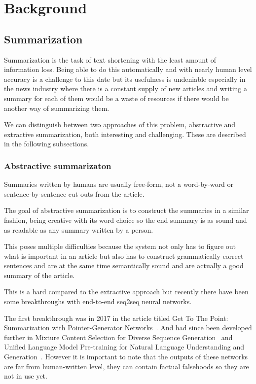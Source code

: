 \chapter{Background}\label{sect:Background}
\section{Summarization}
Summarization is the task of text shortening with the least amount of information loss. Being able to do this automatically and with nearly human level accuracy is a challenge to this date but its usefulness is undeniable especially in the news industry where there is a constant supply of new articles and writing a summary for each of them would be a waste of resources if there would be another way of summarizing them.

We can distinguish between two approaches of this problem, abstractive and extractive summarization, both interesting and challenging. These are described in the following subsections.

\subsection{Abstractive summarizaton}
Summaries written by humans are usually free-form, not a word-by-word or sentence-by-sentence cut outs from the article.

The goal of abstractive summarization is to construct the summaries in a similar fashion, being creative with its word choice so the end summary is as sound and as readable as any summary written by a person.

This poses multiple difficulties because the system not only has to figure out what is important in an article but also has to construct grammatically correct sentences and are at the same time semantically sound and are actually a good summary of the article.

This is a hard compared to the extractive approach but recently there have been some breakthroughs with end-to-end seq2seq neural networks.

The first breakthrough was in 2017 in the article titled Get To The Point: Summarization with Pointer-Generator Networks~\cite{AbstractiveSum}. And had since been developed further in Mixture Content Selection for Diverse Sequence Generation~\cite{DiverseAbstract} and Unified Language Model Pre-training for Natural Language Understanding and Generation~\cite{UniLM}. However it is important to note that the outputs of these networks are far from human-written level, they can contain factual falsehoods so they are not in use yet.

